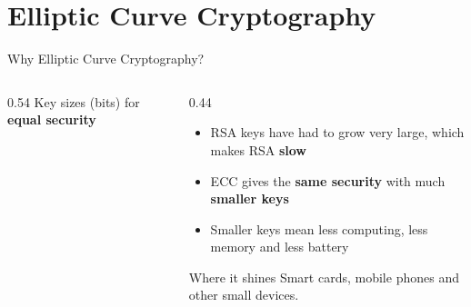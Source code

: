 \documentclass[aspectratio=169,11pt,xcolor={table}]{beamer}
\begin{document}
\setcounter{section}{18}
\section{Elliptic Curve Cryptography}

\begin{frame}{Why Elliptic Curve Cryptography?}
  \begin{columns}[c]
    \begin{column}{0.54\textwidth}
      \centering
      {\small Key sizes (bits) for \textbf{equal security}}\\[2mm]
    \end{column}
    \begin{column}{0.44\textwidth}
      \begin{itemize}\small\setlength{\itemsep}{4pt}
        \item RSA keys have had to grow very large, which makes RSA \textbf{slow}
        \item ECC gives the \textbf{same security} with much \textbf{smaller keys}
        \item Smaller keys mean less computing, less memory and less battery
      \end{itemize}
      \begin{exampleblock}{Where it shines}
        \small Smart cards, mobile phones and other small devices.
      \end{exampleblock}
    \end{column}
  \end{columns}
\end{frame}
\end{document}

